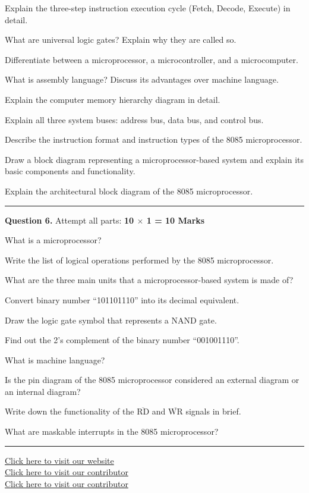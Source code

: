 \documentclass[11pt,a4paper]{article}
\begin{document}
\begin{parts}
  \item Explain the three-step instruction execution cycle (Fetch, Decode, Execute) in detail.
  \item What are universal logic gates? Explain why they are called so.
  \item Differentiate between a microprocessor, a microcontroller, and a microcomputer.
  \item What is assembly language? Discuss its advantages over machine language.
  \item Explain the computer memory hierarchy diagram in detail.
  \item Explain all three system buses: address bus, data bus, and control bus.
  \item Describe the instruction format and instruction types of the 8085 microprocessor.
  \item Draw a block diagram representing a microprocessor-based system and explain its basic components and functionality.
  \item Explain the architectural block diagram of the 8085 microprocessor.
\end{parts}

\bigskip


\rule{\linewidth}{0.4pt}\smallskip




\noindent   \textbf{Question 6.} Attempt all parts: \hfill   \textbf{10 $ \times$ 1 = 10 Marks}

\begin{parts}
  \item What is a microprocessor?
  \item Write the list of logical operations performed by the 8085 microprocessor.
  \item What are the three main units that a microprocessor-based system is made of?
  \item Convert binary number ``101101110'' into its decimal equivalent.
  \item Draw the logic gate symbol that represents a NAND gate.
  \item Find out the 2's complement of the binary number ``001001110''.
  \item What is machine language?
  \item Is the pin diagram of the 8085 microprocessor considered an external diagram or an internal diagram?
  \item Write down the functionality of the $\overline{ \text{RD}}$ and $\overline{ \text{WR}}$ signals in brief.
  \item What are maskable interrupts in the 8085 microprocessor?
\end{parts}

\vfill
\rule{\linewidth}{0.4pt}

\begin{center}\small
\href{https://bhu-exam.vercel.app/}{Click here to visit our website}\\[4pt]\href{https://me-aryan.vercel.app/}{Click here to visit our contributor}\\[4pt]\href{https://quashan-me.vercel.app/}{Click here to visit our contributor}
\end{center}
\end{document}
